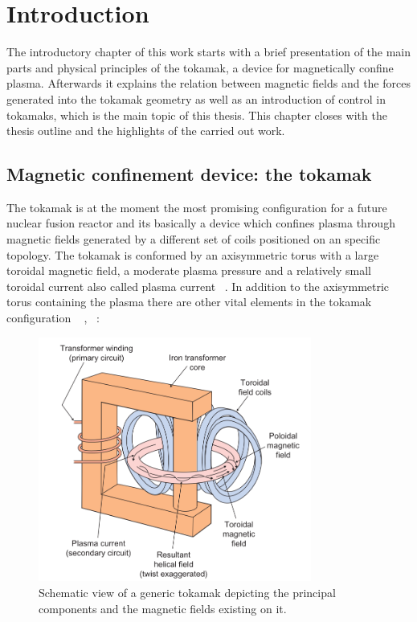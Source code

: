 \chapter{Introduction}

The introductory chapter of this work starts with a brief presentation of the main parts  and physical principles of the tokamak, a device for magnetically confine plasma. Afterwards it  explains the relation between magnetic fields and the forces generated into the tokamak geometry  as well as an introduction of control in tokamaks, which is the main topic of this thesis. This chapter closes with the thesis outline and the highlights of the carried out work. 

\section{Magnetic confinement device: the tokamak}

The tokamak is at the moment the most promising configuration for a future nuclear fusion reactor and its basically a device which confines plasma through magnetic fields generated by a different set of coils positioned on an specific topology.  The tokamak is conformed by an axisymmetric torus with a large toroidal magnetic field, a moderate plasma pressure and a relatively small toroidal current also called plasma current ~\cite[Chapter~13]{Freidberg2007}. In addition to the axisymmetric torus containing the plasma there are other vital elements in the tokamak configuration ~\cite[Chapter~1]{Song2014} , ~\cite[Chapter~1]{Wesson2004}: \smallskip

\begin{figure}[h]
	\centering
	\includegraphics[width=0.8\textwidth]{Chp1/Tokamak_parts.png}
	\caption{ Schematic view of a generic tokamak depicting the principal components  and the magnetic fields existing on it. ~\cite[Chapter~9]{McCracken2005} \label{Tkmk_parts}}
\end{figure}


